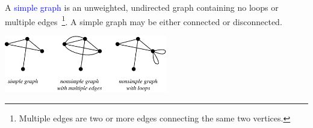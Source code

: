 \documentclass[aspectratio=169]{beamer}
\providecommand{\Blue}[1]{\textcolor{blue}{#1}}
\begin{document}
\begin{frame}[plain]{}

A \Blue{simple graph} is an unweighted, undirected graph containing no loops or multiple 
edges~\footnote{Multiple edges are two or more edges connecting the same two vertices.}.
A simple graph may be either connected or disconnected.
\vspace{.3in}

 \begin{center}
         \includegraphics[height=2.5cm]{./img/lecture2-fig9.png}
       \end{center}
\vspace{.8in}

\end{frame}



    
\end{document}
